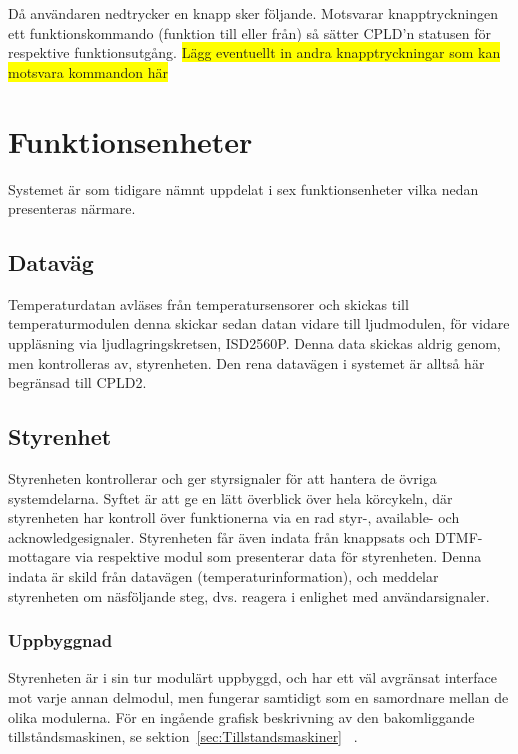 \documentclass[a4paper,11pt]{article}
\begin{document}
Då användaren nedtrycker en knapp sker följande. Motsvarar knapptryckningen ett funktionskommando (funktion till eller från) så sätter CPLD'n statusen för respektive funktionsutgång. \colorbox{yellow}{Lägg eventuellt in andra knapptryckningar som kan motsvara kommandon här}

\section{Funktionsenheter}
\label{sec:Funktionsenheter}
Systemet är som tidigare nämnt uppdelat i sex funktionsenheter vilka nedan presenteras närmare.

	\subsection{Dataväg}
	Temperaturdatan avläses från temperatursensorer och skickas till temperaturmodulen denna skickar sedan datan vidare till ljudmodulen, för vidare uppläsning via ljudlagringskretsen, ISD2560P. Denna data skickas aldrig genom, men kontrolleras av, styrenheten. Den rena datavägen i systemet är alltså här begränsad till CPLD2.
	
	\subsection{Styrenhet}

	Styrenheten kontrollerar och ger styrsignaler för att hantera de övriga systemdelarna. Syftet är att ge en lätt överblick över hela körcykeln, där styrenheten har kontroll över funktionerna via en rad styr-, available- och acknowledgesignaler. Styrenheten får även indata från knappsats och DTMF-mottagare via respektive modul som presenterar data för styrenheten. Denna indata är skild från datavägen (temperaturinformation), och meddelar styrenheten om näsföljande steg, dvs. reagera i enlighet med användarsignaler.

	\subsubsection{Uppbyggnad}

	Styrenheten är i sin tur modulärt uppbyggd, och har ett väl avgränsat interface mot varje annan delmodul, men fungerar samtidigt som en samordnare mellan de olika modulerna.	För en ingående grafisk beskrivning av den bakomliggande tillståndsmaskinen, se sektion~\ref{sec:Tillstandsmaskiner} ~.
\end{document}
